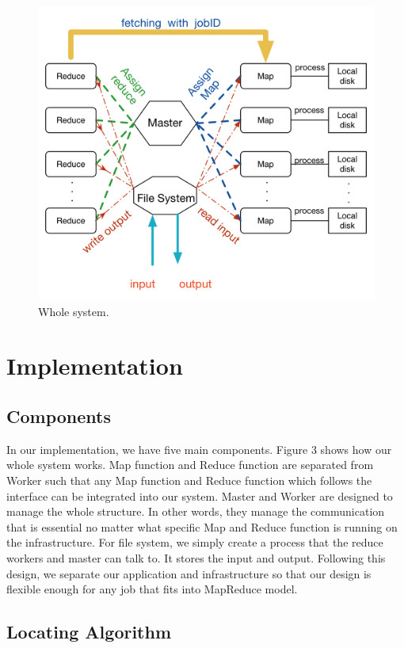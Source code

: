 \documentclass[12pt]{article}
\begin{document}
\begin{figure}[h!]
  
  \centering
    \includegraphics[width=1\textwidth]{3.png}
    \caption{Whole system.}
\end{figure}

\section {Implementation}
\subsection{Components}

In our implementation, we have five main components.  Figure 3 shows how our whole system works.
Map function and Reduce function are separated from Worker such that any Map function and Reduce function which
follows the interface can be integrated into our system.
Master and Worker are designed to manage the whole structure. In other words, they manage the communication that
is essential no matter what specific Map and Reduce function is running on the infrastructure.
For file system, we simply create a process that the reduce workers and master can talk to. It stores the input and output.
Following this design, we separate our application and infrastructure so that our design is flexible enough
for any job that fits into MapReduce model. 
\subsection{Locating Algorithm }
\end{document}
